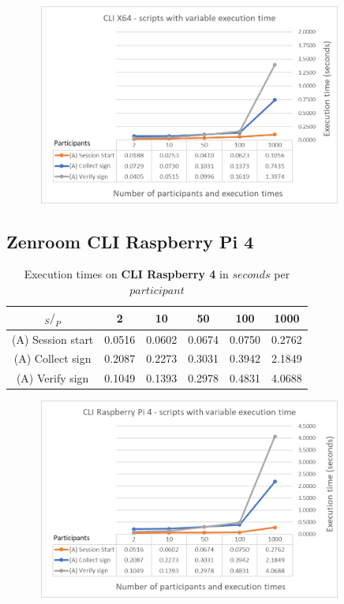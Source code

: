 \documentclass[twocolumn]{article}
\begin{document}
\begin{figure}[h!]
    \centering
    \includegraphics[width=4in, height=2.6in]{graphs/CLIX64.png}
    \label{fig:galaxy}
\end{figure}




\subsection*{Zenroom CLI Raspberry Pi 4}


\begin{table}[h!]
  \begin{center}
    \caption{Execution times on \textbf{CLI Raspberry 4} in $seconds$ per $participant$}
      \label{tab:table1}
        \begin{tabular} {c|c|c|c|c|c}
          \toprule
           \textbf{$_S / _P$} & \textbf{2} & \textbf{10} & \textbf{50} & \textbf{100} & \textbf{1000} \\
          \midrule
          (A) Session start & 0.0516 & 0.0602 & 0.0674 & 0.0750 & 0.2762 \\
          (A) Collect sign & 0.2087 & 0.2273 & 0.3031 & 0.3942 & 2.1849 \\
          (A) Verify sign & 0.1049 & 0.1393 & 0.2978 & 0.4831 & 4.0688 \\
      \bottomrule %
    \end{tabular}
  \end{center}
\end{table}

\begin{figure}[h!]
    \centering
    \includegraphics[width=4in, height=2.6in]{graphs/CLIRaspi4.png}
    \label{fig:galaxy}
\end{figure}
\end{document}
